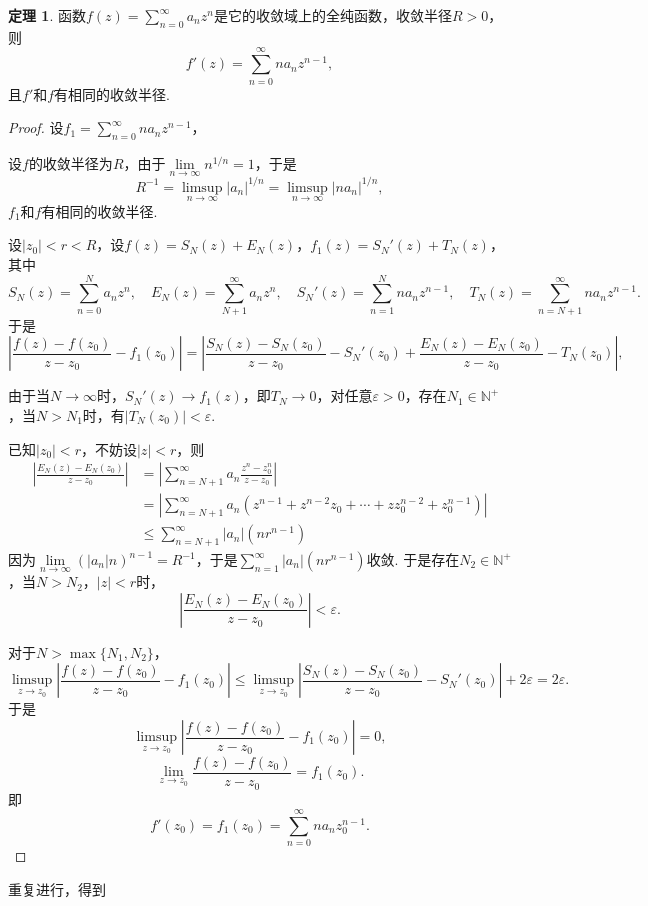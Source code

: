 \documentclass[12pt]{ctexart}
\theoremstyle{definition}
\newtheorem{theorem}{定理}
\theoremstyle{plain}
\begin{document}
	\begin{theorem}
		函数$f(z)=\sum_{n=0}^{\infty}a_nz^n$是它的收敛域上的全纯函数，收敛半径$R>0$，则
	$$f'(z)=\sum_{n=0}^{\infty}na_nz^{n-1},$$
	且$f'$和$f$有相同的收敛半径.
	\end{theorem}
	\begin{proof}
		设$f_1=\sum_{n=0}^{\infty}na_nz^{n-1}$，
		
		设$f$的收敛半径为$R$，由于$\lim\limits_{n\to\infty}n^{1/n}=1$，于是
		$$R^{-1}=\limsup_{n\to\infty}|a_n|^{1/n}=\limsup_{n\to\infty}|na_n|^{1/n},$$
		$f_1$和$f$有相同的收敛半径.
		
		设$|z_0|<r<R$，设$f(z)=S_N(z)+E_N(z)$，$f_1(z)=S_N'(z)+T_N(z)$，其中
		$$S_N(z)=\sum_{n=0}^{N}a_nz^n,\quad E_N(z)=\sum_{N+1}^{\infty}a_nz^n,\quad S_N'(z)=\sum_{n=1}^{N}na_nz^{n-1},\quad T_N(z)=\sum_{n=N+1}^{\infty}na_nz^{n-1}.$$
		于是
		$$\left|\frac{f(z)-f(z_0)}{z-z_0}-f_1(z_0)\right|=\left|\frac{S_N(z)-S_N(z_0)}{z-z_0}-S_N'(z_0)+\frac{E_N(z)-E_N(z_0)}{z-z_0}-T_N(z_0)\right|,$$
		
		由于当$N\to\infty$时，$S_N'(z)\to f_1(z)$，即$T_N\to 0$，对任意$\varepsilon>0$，存在$N_1\in\mathbb{N}^+$，当$N>N_1$时，有$|T_N(z_0)|<\varepsilon$.
		
		已知$|z_0|<r$，不妨设$|z|<r$，则
		\begin{equation}
			\begin{aligned}
				\left|\frac{E_N(z)-E_N(z_0)}{z-z_0}\right|&=\left|\sum_{n=N+1}^{\infty}a_n\frac{z^n-z_0^n}{z-z_0}\right|\\
				&=\left|\sum_{n=N+1}^{\infty}a_n\left(z^{n-1}+z^{n-2}z_0+\cdots+zz_0^{n-2}+z_0^{n-1}\right)\right|\\
				&\leqslant\sum_{n=N+1}^{\infty}|a_n|(nr^{n-1})
			\end{aligned}
		\end{equation}
		因为$\lim\limits_{n\to\infty}\left(|a_n|n\right)^{n-1}=R^{-1}$，于是$\sum_{n=1}^{\infty}|a_n|(nr^{n-1})$收敛. 于是存在$N_2\in\mathbb{N}^+$，当$N>N_2$，$|z|<r$时，
		$$\left|\frac{E_N(z)-E_N(z_0)}{z-z_0}\right|<\varepsilon.$$
		
		对于$N>\max\{N_1,N_2\}$，
		$$\limsup_{z\to z_0}\left|\frac{f(z)-f(z_0)}{z-z_0}-f_1(z_0)\right|\leqslant\limsup_{z\to z_0}\left|\frac{S_N(z)-S_N(z_0)}{z-z_0}-S_N'(z_0)\right|+2\varepsilon=2\varepsilon.$$
		于是
		$$\limsup_{z\to z_0}\left|\frac{f(z)-f(z_0)}{z-z_0}-f_1(z_0)\right|=0,$$
		$$\lim\limits_{z\to z_0}\frac{f(z)-f(z_0)}{z-z_0}=f_1(z_0).$$
		即$$f'(z_0)=f_1(z_0)=\sum_{n=0}^{\infty}na_nz_0^{n-1}.$$
	\end{proof}
	重复进行，得到
\end{document}

